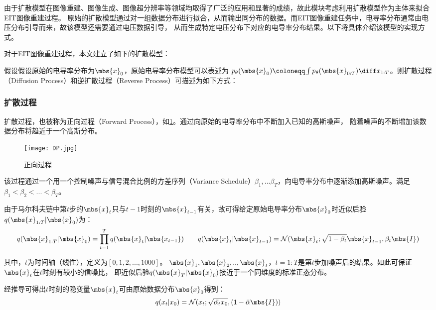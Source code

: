 由于扩散模型在图像重建、图像生成、图像超分辨率等领域均取得了广泛的应用和显著的成绩，故此模块考虑利用扩散模型作为主体来拟合EIT图像重建过程。
原始的扩散模型通过对一组数据分布进行拟合，从而输出同分布的数据。而EIT图像重建任务中，电导率分布通常由电压分布引导而来，故该模型还需要通过电压数据引导，
从而生成特定电压分布下对应的电导率分布结果。以下将具体介绍该模型的实现方式。

对于EIT图像重建过程，本文建立了如下的扩散模型：

假设假设原始的电导率分布为$\mbs{x}_0$，原始电导率分布模型可以表述为
$p_\theta(\mbs{x}_0) \coloneqq \int p_\theta(\mbs{x}_{0:T})\diff x_{1:T}$。则扩散过程（Diffusion Process）和逆扩散过程（Reverse Process）可描述为如下方式：

\subsubsection{扩散过程}

扩散过程，也被称为正向过程（Forward Process），如\cref{figure:dp}。通过向原始的电导率分布中不断加入已知的高斯噪声，
随着噪声的不断增加该数据分布将趋近于一个高斯分布。

\begin{figure}[h]
    \centering
    \texttt{[image: DP.jpg]}
    \caption{正向过程}
    \label{figure:dp}
\end{figure}

该过程通过一个用一个控制噪声与信号混合比例的方差序列（Variance Schedule）$\beta_1, ...\beta_T$，向电导率分布中逐渐添加高斯噪声。满足$\beta_1 < \beta_2 <...<\beta_T$。

由于马尔科夫链中第$t$步的$\mbs{x}_{t}$只与$t-1$时刻的$\mbs{x}_{t-1}$有关，故可得给定原始电导率分布$\mbs{x}_0$时近似后验$q(\mbs{x}_{1:T}|\mbs{x}_0)$为：
\begin{equation}
    \centering
    q(\mbs{x}_{1:T}|\mbs{x}_0) = \prod_{t=1}^{T} q(\mbs{x}_{t}|\mbs{x_{t-1}}) \qquad
    q(\mbs{x}_{t}|\mbs{x}_{t-1}) = \mathcal{N}(\mbs{x}_{t}; \sqrt{1-\beta_t}\mbs{x}_{t-1}, \beta_t\mbs{I})
    \label{equation:ddpm_f}
  \end{equation}

其中，$t$为时间轴（线性），定义为$[0,1,2,...,1000]$。
$\mbs{x}_1, \mbs{x}_2,..,\mbs{x}_{t}$，$t=1:T$是第$t$步加噪声后的结果。如此可保证$\mbs{x}_{t}$在$t$时刻有较小的信噪比，
即近似后验$q(\mbs{x}_{T}|\mbs{x}_0)$接近于一个同维度的标准正态分布。

经推导可得出$t$时刻的隐变量$\mbs{x}_{t}$可由原始数据分布$\mbs{x}_0$得到：
\begin{equation}
  \centering
  q(x_t|x_0) = \mathcal{N}(x_t; \sqrt{\bar{\alpha_t}x_0}, (1-\bar{\alpha}\mbs{I}))
\end{equation}


